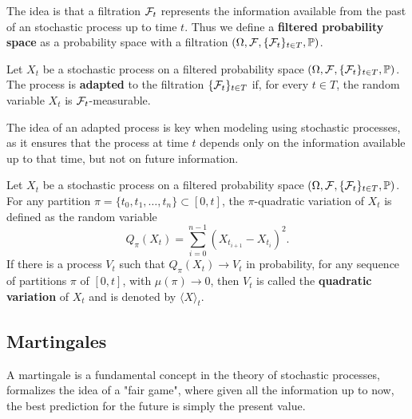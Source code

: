 The idea is that a filtration $\mathcal{F}_t$ represents the information available from the past of an stochastic process up to time $t$.
Thus we define a \textbf{filtered probability space} as a probability space with a filtration $(\Omega, \mathcal{F}, \{ \mathcal{F}_t \}_{t \in T}, \mathbb{P})$.

\begin{definition}
    Let $X_t$ be a stochastic process on a filtered probability space $(\Omega, \mathcal{F}, \{ \mathcal{F}_t \}_{t \in T}, \mathbb{P})$.
    The process is \textbf{adapted} to the filtration $\{ \mathcal{F}_t \}_{t \in T}$ 
    if, for every $t \in T$,
    the random variable $X_t$ is $\mathcal{F}_t$-measurable.
\end{definition}

The idea of an adapted process is key when modeling using stochastic processes,
as it ensures that the process at time $t$ depends only on the information available up to that time,
but not on future information.

\begin{definition}
    Let $X_t$ be a stochastic process on a filtered probability space $(\Omega, \mathcal{F}, \{ \mathcal{F}_t \}_{t \in T}, \mathbb{P})$.
    For any partition $\pi = \{ t_0, t_1, \ldots, t_n \} \subset [0, t]$,
    the $\pi$-quadratic variation of $X_t$ is defined as the random variable
    \begin{equation*}
        Q_\pi(X_t) = \sum_{i = 0}^{n - 1} (X_{t_{i + 1}} - X_{t_i})^2.
    \end{equation*}
    If there is a process $V_t$ such that $Q_\pi(X_t) \rightarrow V_t$ in probability,
    for any sequence of partitions $\pi$ of $[0, t]$,
    with $\mu(\pi) \rightarrow 0$,
    then $V_t$ is called the \textbf{quadratic variation} of $X_t$ and is denoted by $\langle X \rangle_t$.
\end{definition}

\subsection{Martingales}

A martingale is a fundamental concept in the theory of stochastic processes,
formalizes the idea of a "fair game",
where given all the information up to now,
the best prediction for the future is simply the present value.

